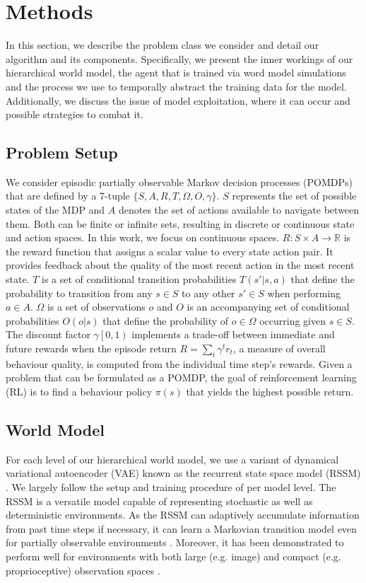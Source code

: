 \documentclass{article}
\begin{document}
\section{Methods}

In this section, we describe the problem class we consider and detail our algorithm and its components. 
Specifically, we present the inner workings of our hierarchical world model, the agent that is trained via word model simulations and the process we use to temporally abstract the training data for the model. 
Additionally, we discuss the issue of model exploitation, where it can occur and possible strategies to combat it.  

\subsection{Problem Setup}
We consider episodic partially observable Markov decision processes (POMDPs) that are defined by a 7-tuple $\{S, A, R, T, \Omega, O, \gamma \}$.
$S$ represents the set of possible states of the MDP and $A$ denotes the set of actions available to navigate between them. Both can be finite or infinite sets, resulting in discrete or continuous state and action spaces. In this work, we focus on continuous spaces.
$R: S \times A \rightarrow \mathbb{R}$ is the reward function that assigns a scalar value to every state action pair.
It provides feedback about the quality of the most recent action in the most recent state.
$T$ is a set of conditional transition probabilities $T(s' | s, a)$ that define the probability to transition from any $s \in S$ to any other $s' \in S$ when performing $a \in A$.
$\Omega$ is a set of observations $o$ and $O$ is an accompanying set of conditional probabilities $O(o|s)$ that define the probability of $o \in \Omega$ occurring given $s \in S$.
The discount factor $\gamma \left[0, 1 \right)$ implements a trade-off between immediate and future rewards when the episode return $R = \sum_t \gamma^t r_t$, a measure of overall behaviour quality, is computed from the individual time step's rewards. 
Given a problem that can be formulated as a POMDP, the goal of reinforcement learning (RL) is to find a behaviour policy $\pi(s)$ that yields the highest possible return. 

\subsection{World Model}\label{sec:world_model}

For each level of our hierarchical world model, we use a variant of dynamical variational autoencoder (VAE) \citep{girin2020dynamical} known as the recurrent state space model (RSSM) \citep{hafner2019learning}. 
We largely follow the setup and training procedure of \citet{hafner2019learning} per model level. The RSSM is a versatile model capable of representing stochastic as well as deterministic environments. 
As the RSSM can adaptively accumulate information from past time steps if necessary, it can learn a Markovian transition model even for partially observable environments \citep{hafner2020dream}. 
Moreover, it has been demonstrated to perform well for environments with both large (e.g. image) and compact (e.g. proprioceptive) observation spaces \citep{xie2021latent}.
\end{document}
